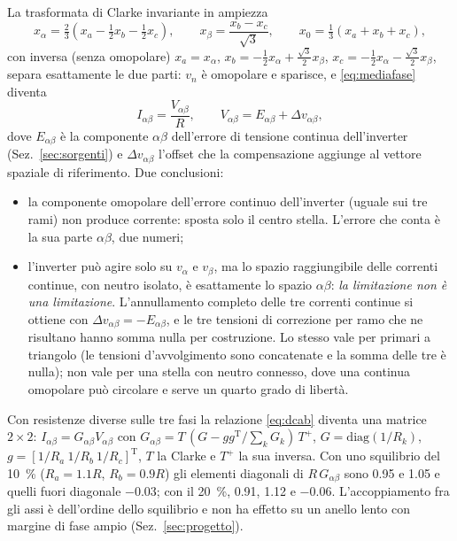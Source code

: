 \documentclass[10pt,a4paper]{scrartcl}
\newcommand{\ab}{\alpha\beta}
\newcommand{\Iab}{I_{\ab}}
\newcommand{\Eab}{E_{\ab}}
\newcommand{\dvab}{\Delta v_{\ab}}
\begin{document}
\begin{onehalfspace}
La trasformata di Clarke invariante in ampiezza \cite{clarke1951}
\begin{equation}
x_\alpha = \tfrac23\left(x_a - \tfrac12 x_b - \tfrac12 x_c\right), \qquad x_\beta = \frac{x_b - x_c}{\sqrt3}, \qquad x_0 = \tfrac13\left(x_a + x_b + x_c\right),
\label{eq:clarke}
\end{equation}
con inversa (senza omopolare) $x_a = x_\alpha$, $x_b = -\tfrac12 x_\alpha + \tfrac{\sqrt3}{2}x_\beta$, $x_c = -\tfrac12 x_\alpha - \tfrac{\sqrt3}{2}x_\beta$, separa esattamente le due parti: $v_n$ è omopolare e sparisce, e \eqref{eq:mediafase} diventa
\begin{equation}
\Iab = \frac{V_{\ab}}{R}, \qquad V_{\ab} = \Eab + \dvab ,
\label{eq:dcab}
\end{equation}
dove $\Eab$ è la componente $\alpha\beta$ dell'errore di tensione continua dell'inverter (Sez.~\ref{sec:sorgenti}) e $\dvab$ l'offset che la compensazione aggiunge al vettore spaziale di riferimento. Due conclusioni:
\begin{itemize}
\item la componente omopolare dell'errore continuo dell'inverter (uguale sui tre rami) non produce corrente: sposta solo il centro stella. L'errore che conta è la sua parte $\alpha\beta$, due numeri;
\item l'inverter può agire solo su $v_\alpha$ e $v_\beta$, ma lo spazio raggiungibile delle correnti continue, con neutro isolato, è esattamente lo spazio $\alpha\beta$: \emph{la limitazione non è una limitazione}. L'annullamento completo delle tre correnti continue si ottiene con $\dvab = -\Eab$, e le tre tensioni di correzione per ramo che ne risultano hanno somma nulla per costruzione. Lo stesso vale per primari a triangolo (le tensioni d'avvolgimento sono concatenate e la somma delle tre è nulla); non vale per una stella con neutro connesso, dove una continua omopolare può circolare e serve un quarto grado di libertà.
\end{itemize}

Con resistenze diverse sulle tre fasi la relazione \eqref{eq:dcab} diventa una matrice $2\times2$: $\Iab = G_{\ab}V_{\ab}$ con $G_{\ab} = T\,(G - g g^{\mathrm T}/\sum_k G_k)\,T^{+}$, $G = \mathrm{diag}(1/R_k)$, $g = [1/R_a\ 1/R_b\ 1/R_c]^{\mathrm T}$, $T$ la Clarke e $T^+$ la sua inversa. Con uno squilibrio del \SI{10}{\percent} ($R_a = \num{1.1}R$, $R_b = \num{0.9}R$) gli elementi diagonali di $R\,G_{\ab}$ sono \num{0.95} e \num{1.05} e quelli fuori diagonale \num{-0.03}; con il \SI{20}{\percent}, \num{0.91}, \num{1.12} e \num{-0.06}. L'accoppiamento fra gli assi è dell'ordine dello squilibrio e non ha effetto su un anello lento con margine di fase ampio (Sez.~\ref{sec:progetto}).


\end{onehalfspace}
\end{document}
